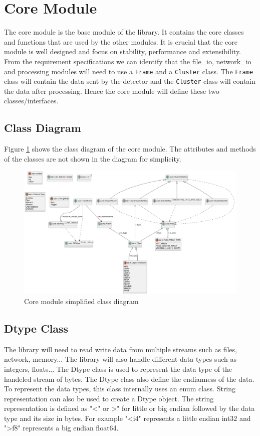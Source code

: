 \documentclass[./chapitre3.tex]{subfiles}
\begin{document}
\section{Core Module}
The core module is the base module of the library. It contains the core classes and functions
that are used by the other modules. It is crucial that the core module is well designed and
focus on stability, performance and extensibility. From the requirement specifications we can
identify that the file\_io, network\_io and processing modules will need to use a \lstinline|Frame| and a
\lstinline|Cluster| class. The \lstinline|Frame| class will contain the data sent by the detector and the \lstinline|Cluster| class
will contain the data after processing. Hence the core module will define these two classes/interfaces.\\

\subsection{Class Diagram}
Figure \ref{fig:core_class_diagram} shows the class diagram of the core module. The attributes
and methods of the classes are not shown in the diagram for simplicity.

\begin{figure}
    \centering
    \includegraphics[width=\textwidth]{Chapitre3/figures/core_class_simplified.png}
    \caption{Core module simplified class diagram}
    \label{fig:core_class_diagram}
\end{figure}
\subsection{Dtype Class}
The library will need to read write data from multiple streams such as files, network, memory...
The library will also handle different data types such as integers, floats... The Dtype class
is used to represent the data type of the handeled stream of bytes. The Dtype class also
define the endianness of the data. To represent the data types, this class internally uses an enum
class. String representation can also be used to create a Dtype object. The string representation
is defined as "\textless" or \textgreater" for little or big endian followed by the data type and its size in bytes.
For example "\textless i4" represents a little endian int32 and "\textgreater f8" represents a big endian float64.
\\
\end{document}
